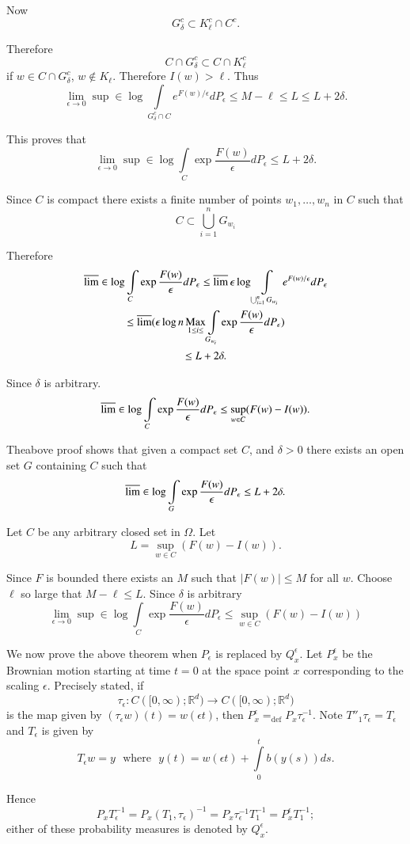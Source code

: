 \begin{step}
Now\pageoriginale
$$
G^{c}_{\delta}\subset K^{c}_{\ell}\cap C^{c}.
$$

Therefore
$$
C\cap G^{c}_{\delta}\subset C\cap K^{c}_{\ell}
$$
if $w\in C\cap G^{c}_{\delta}$, $w\not\in K_{\ell}$. Therefore
$I(w)>\ell$. Thus
$$
\lim\limits_{\epsilon\to 0}\sup \in \log
\int\limits_{G^{c}_{\delta}\cap C}e^{F(w)/\epsilon}dP_{\epsilon}\leq
M-\ell \leq L\leq L+2\delta.
$$

This proves that
$$
\lim\limits_{\epsilon\to 0}\sup \in \log \int\limits_{C}\exp
\frac{F(w)}{\epsilon}dP_{\epsilon}\leq L+2\delta.
$$

Since $C$ is compact there exists a finite number of points
$w_{1},\ldots,w_{n}$ in $C$ such that
$$
C\subset \bigcup\limits^{n}_{i=1}G_{w_{i}}
$$

Therefore
\begin{gather*}
\varlimsup \in \log \int\limits_{C}\exp
\frac{F(w)}{\epsilon}dP_{\epsilon}\leq \varlimsup \epsilon \log
\int\limits_{\bigcup^{n}_{i=1}G_{w_{i}}}e^{F(w)/\epsilon}dP_{\epsilon}\\
\leq \varlimsup (\epsilon \log n\operatorname*{Max}\limits_{1\leq i\leq
}\int\limits_{G_{w_{i}}}\exp \frac{F(w)}{\epsilon}dP_{\epsilon})\\
\leq L+2\delta.
\end{gather*}

Since $\delta$ is arbitrary.
$$
\varlimsup \in \log \int\limits_{C}\exp
\frac{F(w)}{\epsilon}dP_{\epsilon}\leq \sup\limits_{w\in
  C}(F(w)-I(w)).
$$
\end{step}

The\pageoriginale above proof shows that given a compact set $C$, and
$\delta>0$ there exists an open set $G$ containing $C$ such that
$$
\varlimsup \in \log\int\limits_{G}\exp
\frac{F(w)}{\epsilon}dP_{\epsilon}\leq L+2\delta.
$$

\begin{step}%
Let $C$ be any arbitrary closed set in $\Omega$. Let
$$
L=\sup\limits_{w\in C}(F(w)-I(w)).
$$

Since $F$ is bounded there exists an $M$ such that $|F(w)|\leq M$ for
all $w$. Choose $\ell$ so large that $M-\ell\leq L$. Since $\delta$ is
arbitrary 
$$
\lim\limits_{\epsilon\to 0}\sup \in\log \int\limits_{C}\exp
\frac{F(w)}{\epsilon}dP_{\epsilon}\leq \sup\limits_{w\in C}(F(w)-I(w))
$$

We now prove the above theorem when $P_{\epsilon}$ is replaced by
$Q^{\epsilon}_{x}$. Let $P^{\epsilon}_{x}$ be the Brownian motion
starting at time $t=0$ at the space point $x$ corresponding to the
scaling $\epsilon$. Precisely stated, if
$$
\tau_{\epsilon}:C([0,\infty);\mathbb{R}^{d})\to
  C([0,\infty);\mathbb{R}^{d})
$$
is the map given by $(\tau_{\epsilon}w)(t)=w(\epsilon t)$, then
$P^{\epsilon}_{x}{\displaystyle{\mathop{=}_{\text{def}}}}P_{x}\tau^{-1}_{\epsilon}$. Note
$T''_{1}\tau_{\epsilon}=T_{\epsilon}$ and $T_{\epsilon}$ is given by
$$
T_{\epsilon}w=y\text{~ where~ } y(t)=w(\epsilon
t)+\int\limits^{t}_{0}b(y(s))ds. 
$$

Hence
$$
P_{x}T^{-1}_{\epsilon}=P_{x}(T_{1},\tau_{\epsilon})^{-1}=P_{x}\tau^{-1}_{\epsilon}T^{-1}_{1}=P^{\epsilon}_{x}T^{-1}_{1};
$$
either of these probability measures is denoted by $Q^{\epsilon}_{x}$.
\end{step}

